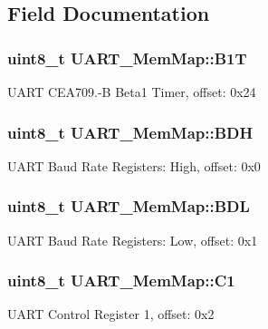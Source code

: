 \subsection{Field Documentation}
\hypertarget{struct_u_a_r_t___mem_map_aea11cf4a0a5b167335d2ce4a23d488c7}{}
\subsubsection[{B1\+T}]{\setlength{\rightskip}{0pt plus 5cm}uint8\+\_\+t U\+A\+R\+T\+\_\+\+Mem\+Map\+::\+B1\+T}\label{struct_u_a_r_t___mem_map_aea11cf4a0a5b167335d2ce4a23d488c7}
U\+A\+R\+T C\+E\+A709.-\/\+B Beta1 Timer, offset\+: 0x24 \hypertarget{struct_u_a_r_t___mem_map_a50621a015b23211a706aa74180fa4689}{}
\subsubsection[{B\+D\+H}]{\setlength{\rightskip}{0pt plus 5cm}uint8\+\_\+t U\+A\+R\+T\+\_\+\+Mem\+Map\+::\+B\+D\+H}\label{struct_u_a_r_t___mem_map_a50621a015b23211a706aa74180fa4689}
U\+A\+R\+T Baud Rate Registers\+: High, offset\+: 0x0 \hypertarget{struct_u_a_r_t___mem_map_ac846186ffd0e53fbac32cd57c6f9acc4}{}
\subsubsection[{B\+D\+L}]{\setlength{\rightskip}{0pt plus 5cm}uint8\+\_\+t U\+A\+R\+T\+\_\+\+Mem\+Map\+::\+B\+D\+L}\label{struct_u_a_r_t___mem_map_ac846186ffd0e53fbac32cd57c6f9acc4}
U\+A\+R\+T Baud Rate Registers\+: Low, offset\+: 0x1 \hypertarget{struct_u_a_r_t___mem_map_ac2300c7c40e63ca712d0ec5180332f4b}{}
\subsubsection[{C1}]{\setlength{\rightskip}{0pt plus 5cm}uint8\+\_\+t U\+A\+R\+T\+\_\+\+Mem\+Map\+::\+C1}\label{struct_u_a_r_t___mem_map_ac2300c7c40e63ca712d0ec5180332f4b}
U\+A\+R\+T Control Register 1, offset\+: 0x2 \hypertarget{struct_u_a_r_t___mem_map_a3e49aeb27f3613fd01a17a3c76e785b7}{}
